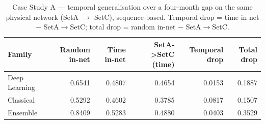 \begin{table}
\caption{Case Study A --- temporal generalisation over a four-month gap on the same physical network (SetA $\rightarrow$ SetC), sequence-based. Temporal drop = time in-net $-$ SetA$\to$SetC; total drop = random in-net $-$ SetA$\to$SetC.}
\label{tab:q6_cs_temporal}
\begin{tabular}{lrrrrr}
\toprule
Family & Random in-net & Time in-net & SetA->SetC (time) & Temporal drop & Total drop \\
\midrule
Deep Learning & 0.6541 & 0.4807 & 0.4654 & 0.0153 & 0.1887 \\
Classical & 0.5292 & 0.4602 & 0.3785 & 0.0817 & 0.1507 \\
Ensemble & 0.8409 & 0.5283 & 0.4880 & 0.0403 & 0.3529 \\
\bottomrule
\end{tabular}
\end{table}

